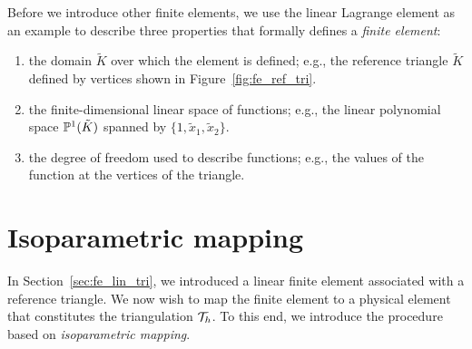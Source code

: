 Before we introduce other finite elements, we use the linear Lagrange element as an example to describe three properties that formally defines a \emph{finite element}:
\begin{enumerate}
\item the domain $\tilde K$ over which the element is defined; e.g., the reference triangle $\tilde K$ defined by vertices shown in Figure~\ref{fig:fe_ref_tri}.
\item the finite-dimensional linear space of functions; e.g., the linear polynomial space $\mathbb{P}^1(\tilde K)$ spanned by $\{ 1, \tilde x_1, \tilde x_2 \}$.
\item the degree of freedom used to describe functions; e.g., the values of the function at the vertices of the triangle.
\end{enumerate}

\section{Isoparametric mapping}
In Section~\ref{sec:fe_lin_tri}, we introduced a linear finite element associated with a reference triangle.  We now wish to map the finite element to a physical element that constitutes the triangulation $\mathcal{T}_h$.  To this end, we introduce the procedure based on \emph{isoparametric mapping}.

\begin{figure}
  \centering
\end{figure}


